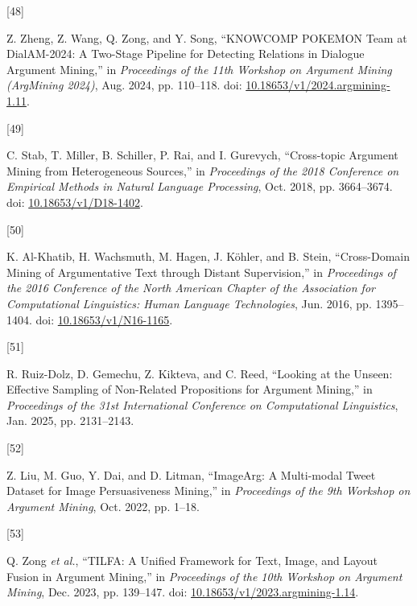 \documentclass[twocolumn]{article}
\newlength{\cslhangindent}
\newlength{\csllabelwidth}
\newenvironment{CSLReferences}[2] %
 {\begin{list}{}{%
  \setlength{\itemindent}{0pt}
  \setlength{\leftmargin}{0pt}
  \setlength{\parsep}{0pt}
  \ifodd #1
   \setlength{\leftmargin}{\cslhangindent}
   \setlength{\itemindent}{-1\cslhangindent}
  \fi
  \setlength{\itemsep}{#2\baselineskip}}}
 {\end{list}}
\newcommand{\CSLLeftMargin}[1]{\parbox[t]{\csllabelwidth}{\strut#1\strut}}
\newcommand{\CSLRightInline}[1]{\parbox[t]{\linewidth - \csllabelwidth}{\strut#1\strut}}
\begin{document}
\begin{CSLReferences}{0}{0}
\CSLLeftMargin{{[}48{]} }%
\CSLRightInline{Z. Zheng, Z. Wang, Q. Zong, and Y. Song, {``{KNOWCOMP
POKEMON Team} at {DialAM-2024}: {A Two-Stage Pipeline} for {Detecting
Relations} in {Dialogue Argument Mining},''} in \emph{Proceedings of the
11th {Workshop} on {Argument Mining} ({ArgMining} 2024)}, Aug. 2024, pp.
110--118. doi:
\href{https://doi.org/10.18653/v1/2024.argmining-1.11}{10.18653/v1/2024.argmining-1.11}.}

\CSLLeftMargin{{[}49{]} }%
\CSLRightInline{C. Stab, T. Miller, B. Schiller, P. Rai, and I.
Gurevych, {``Cross-topic {Argument Mining} from {Heterogeneous
Sources},''} in \emph{Proceedings of the 2018 {Conference} on {Empirical
Methods} in {Natural Language Processing}}, Oct. 2018, pp. 3664--3674.
doi: \href{https://doi.org/10.18653/v1/D18-1402}{10.18653/v1/D18-1402}.}

\CSLLeftMargin{{[}50{]} }%
\CSLRightInline{K. Al-Khatib, H. Wachsmuth, M. Hagen, J. Köhler, and B.
Stein, {``Cross-{Domain Mining} of {Argumentative Text} through {Distant
Supervision},''} in \emph{Proceedings of the 2016 {Conference} of the
{North American Chapter} of the {Association} for {Computational
Linguistics}: {Human Language Technologies}}, Jun. 2016, pp. 1395--1404.
doi: \href{https://doi.org/10.18653/v1/N16-1165}{10.18653/v1/N16-1165}.}

\CSLLeftMargin{{[}51{]} }%
\CSLRightInline{R. Ruiz-Dolz, D. Gemechu, Z. Kikteva, and C. Reed,
{``Looking at the {Unseen}: {Effective Sampling} of {Non-Related
Propositions} for {Argument Mining},''} in \emph{Proceedings of the 31st
{International Conference} on {Computational Linguistics}}, Jan. 2025,
pp. 2131--2143.}

\CSLLeftMargin{{[}52{]} }%
\CSLRightInline{Z. Liu, M. Guo, Y. Dai, and D. Litman, {``{ImageArg}: {A
Multi-modal Tweet Dataset} for {Image Persuasiveness Mining},''} in
\emph{Proceedings of the 9th {Workshop} on {Argument Mining}}, Oct.
2022, pp. 1--18.}

\CSLLeftMargin{{[}53{]} }%
\CSLRightInline{Q. Zong \emph{et al.}, {``{TILFA}: {A Unified Framework}
for {Text}, {Image}, and {Layout Fusion} in {Argument Mining},''} in
\emph{Proceedings of the 10th {Workshop} on {Argument Mining}}, Dec.
2023, pp. 139--147. doi:
\href{https://doi.org/10.18653/v1/2023.argmining-1.14}{10.18653/v1/2023.argmining-1.14}.}


\end{CSLReferences}
\end{document}
